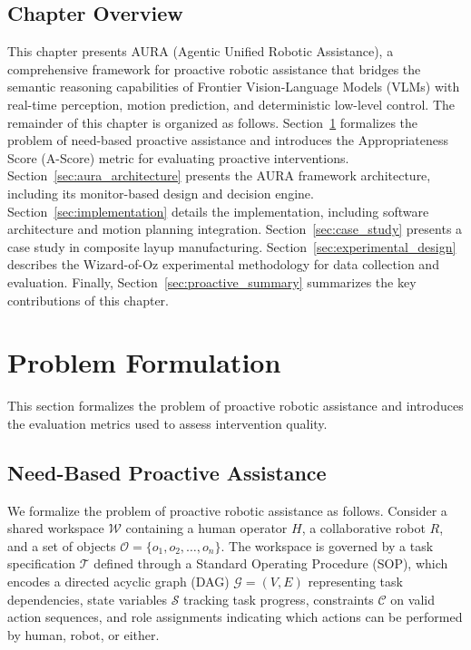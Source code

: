\subsection{Chapter Overview}

This chapter presents AURA (Agentic Unified Robotic Assistance), a comprehensive framework for proactive robotic assistance that bridges the semantic reasoning capabilities of Frontier Vision-Language Models (VLMs) with real-time perception, motion prediction, and deterministic low-level control. The remainder of this chapter is organized as follows. Section~\ref{sec:problem_formulation} formalizes the problem of need-based proactive assistance and introduces the Appropriateness Score (A-Score) metric for evaluating proactive interventions. Section~\ref{sec:aura_architecture} presents the AURA framework architecture, including its monitor-based design and decision engine. Section~\ref{sec:implementation} details the implementation, including software architecture and motion planning integration. Section~\ref{sec:case_study} presents a case study in composite layup manufacturing. Section~\ref{sec:experimental_design} describes the Wizard-of-Oz experimental methodology for data collection and evaluation. Finally, Section~\ref{sec:proactive_summary} summarizes the key contributions of this chapter.

\section{Problem Formulation}
\label{sec:problem_formulation}

This section formalizes the problem of proactive robotic assistance and introduces the evaluation metrics used to assess intervention quality.

\subsection{Need-Based Proactive Assistance}

We formalize the problem of proactive robotic assistance as follows. Consider a shared workspace $\mathcal{W}$ containing a human operator $H$, a collaborative robot $R$, and a set of objects $\mathcal{O} = \{o_1, o_2, \ldots, o_n\}$. The workspace is governed by a task specification $\mathcal{T}$ defined through a Standard Operating Procedure (SOP), which encodes a directed acyclic graph (DAG) $\mathcal{G} = (V, E)$ representing task dependencies, state variables $\mathcal{S}$ tracking task progress, constraints $\mathcal{C}$ on valid action sequences, and role assignments indicating which actions can be performed by human, robot, or either.


